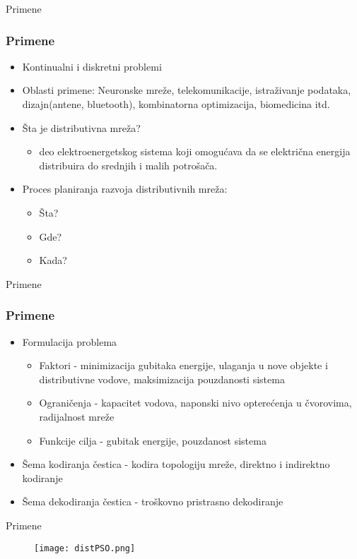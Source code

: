 \documentclass{beamer}
\begin{document}
\begin{frame}{Primene}

\frametitle{Primene}
\begin{itemize}
\item Kontinualni i diskretni problemi
\item Oblasti primene: Neuronske mreže, telekomunikacije, istraživanje podataka, dizajn(antene, bluetooth), kombinatorna optimizacija, biomedicina itd.
\item Šta je distributivna mreža?
\begin{itemize}
    \item deo elektroenergetskog sistema koji omogućava da se električna energija distribuira do srednjih i malih potrošača. 
\end{itemize}
\item Proces planiranja razvoja distributivnih mreža:
\begin{itemize}
    \item Šta?
    \item Gde? 
    \item Kada?
\end{itemize}

\end{itemize}


\end{frame}


\begin{frame}{Primene}

\frametitle{Primene}
\begin{itemize}
\item Formulacija problema
\begin{itemize}
    \item Faktori - minimizacija gubitaka energije, ulaganja u nove objekte i distributivne vodove, maksimizacija pouzdanosti sistema
    \item Ograničenja - kapacitet vodova, naponski nivo opterećenja u čvorovima, radijalnost mreže
    \item Funkcije cilja - gubitak energije, pouzdanost sistema
\end{itemize}
\item Šema kodiranja čestica - kodira topologiju mreže, direktno i indirektno kodiranje
\item Šema dekodiranja čestica - troškovno pristrasno dekodiranje

\end{itemize}


\end{frame}


\begin{frame}{Primene}
\begin{figure}
\texttt{[image: distPSO.png]}
\end{figure}

\end{frame}
\end{document}
